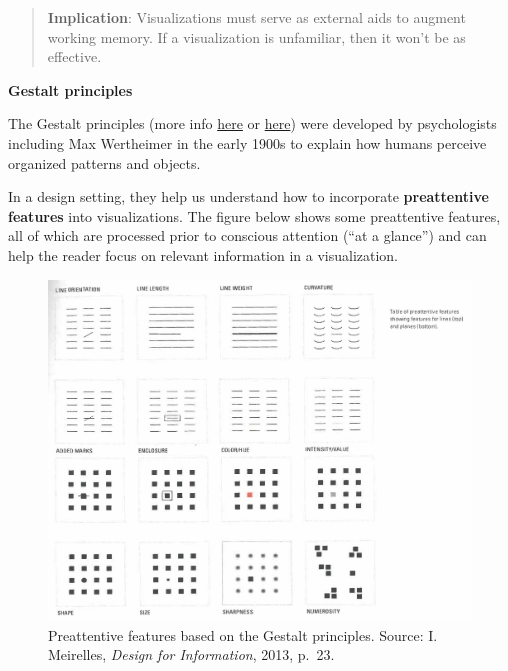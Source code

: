 \documentclass[
  letterpaper,
  DIV=11,
  numbers=noendperiod]{scrreprt}
\begin{document}
\begin{quote}
\textbf{Implication}: Visualizations must serve as external aids to
augment working memory. If a visualization is unfamiliar, then it won't
be as effective.
\end{quote}

\textbf{Gestalt principles}

The Gestalt principles (more info
\href{https://en.wikipedia.org/wiki/Principles_of_grouping}{here} or
\href{https://www.smashingmagazine.com/2014/03/design-principles-visual-perception-and-the-principles-of-gestalt/}{here})
were developed by psychologists including Max Wertheimer in the early
1900s to explain how humans perceive organized patterns and objects.

In a design setting, they help us understand how to incorporate
\textbf{preattentive features} into visualizations. The figure below
shows some preattentive features, all of which are processed prior to
conscious attention (``at a glance'') and can help the reader focus on
relevant information in a visualization.

\begin{figure}[H]

{\centering \includegraphics[width=1\textwidth,height=\textheight]{src/../images/gestalt.png}

}

\caption{Preattentive features based on the Gestalt principles. Source:
I. Meirelles, \emph{Design for Information}, 2013, p.~23.}

\end{figure}%
\end{document}
